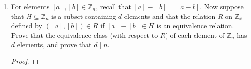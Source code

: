\documentclass[12pt,a4paper,reqno,parskip=full]{amsart}
\numberwithin{equation}{section}
\theoremstyle{plain}
\theoremstyle{definition}
\begin{document}
\begin{enumerate}
\begin{itemize}
\begin{proof}
\begin{enumerate}[i]
                          If $(a,b)$ and $(b,c)$ are in $R\cap S$, then they must be in both $R$ and
                          $S$. Since $R$ and $S$ are equivalence relations they must also contain
                          $(a,c)$, so $(a,c)\in R\cap S$.
                  \end{enumerate}
                \end{proof}
        \end{itemize}
  \item For elements $[a],[b]\in\mathbb{Z}_n$, recall that  $[a]-[b]=[a-b]$. Now suppose that
        $H\subseteq\mathbb{Z}_n$ is a subset containing $d$ elements and that the relation $R$ on
        $\mathbb{Z_n}$ defined by $([a],[b])\in R$ if $[a]-[b]\in H$ is an equivalence relation.
        Prove that the equivalence class (with respect to $R$) of each element of $\mathbb{Z}_n$ has
        $d$ elements, and prove that $d\mid n$.
        \begin{proof}

        \end{proof}
\end{enumerate}
\end{document}
